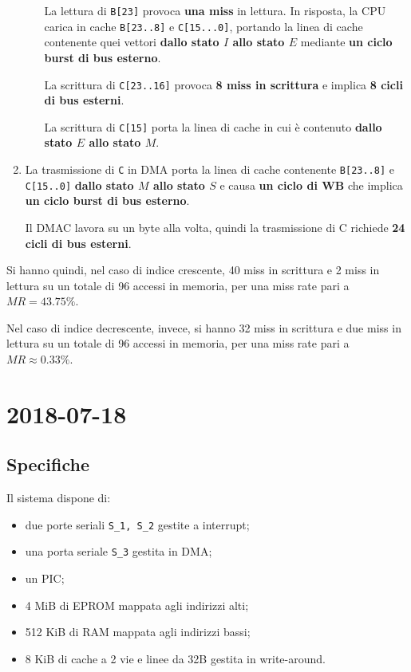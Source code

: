 \documentclass[a4paper]{article}
\begin{document}
\begin{enumerate}
\begin{itemize}
 La lettura di \texttt{B[23]} provoca \textbf{una miss} in lettura.
In risposta, la CPU carica in cache \texttt{B[23..8]} e \texttt{C[15...0]}, portando la linea di cache contenente quei vettori \textbf{dallo stato $I$ allo stato $E$} mediante \textbf{un ciclo burst di bus esterno}.

La scrittura di \texttt{C[23..16]} provoca \textbf{8 miss in scrittura} e implica \textbf{8 cicli di bus esterni}.

La scrittura di \texttt{C[15]} porta la linea di cache in cui è contenuto \textbf{dallo stato $E$ allo stato $M$}.
\end{itemize}

\item La trasmissione di \texttt{C} in DMA porta la linea di cache contenente \texttt{B[23..8]} e \texttt{C[15..0]} \textbf{dallo stato $M$ allo stato $S$} e causa \textbf{un ciclo di WB} che implica \textbf{un ciclo burst di bus esterno}.

Il DMAC lavora su un byte alla volta, quindi la trasmissione di C richiede \textbf{24 cicli di bus esterni}.


\end{enumerate}

Si hanno quindi, nel caso di indice crescente, 40 miss in scrittura e 2 miss in lettura su un totale di 96 accessi in memoria, per una miss rate pari a $MR = 43.75\%$.

Nel caso di indice decrescente, invece, si hanno 32 miss in scrittura e due miss in lettura su un totale di 96 accessi in memoria, per una miss rate pari a $MR \approx 0.33\%$.

\section{2018-07-18}

\subsection{Specifiche}
Il sistema dispone di:

\begin{itemize}
\item due porte seriali \texttt{S\_1, S\_2} gestite a interrupt;
\item una porta seriale \texttt{S\_3} gestita in DMA;
\item un PIC;
\item 4 MiB di EPROM mappata agli indirizzi alti;
\item 512 KiB di RAM mappata agli indirizzi bassi;
\item 8 KiB di cache a 2 vie e linee da 32B gestita in write-around.
\end{itemize}
\end{document}
